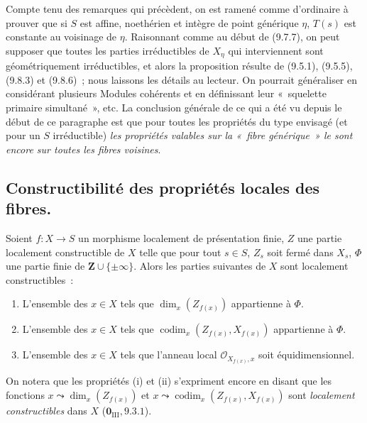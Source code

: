 \begin{remark}[9.8.9]
Compte tenu des remarques qui précèdent, on est ramené comme d'ordinaire à
prouver que si $S$ est affine, noethérien et intègre de point générique $\eta$,
$T(s)$ est constante au voisinage de $\eta$. Raisonnant comme au début de
(9.7.7), on peut supposer que toutes les parties irréductibles de $X_\eta$ qui
interviennent sont géométriquement irréductibles, et alors la proposition
résulte de (9.5.1), (9.5.5), (9.8.3) et (9.8.6)~; nous laissons les détails au
lecteur. On pourrait généraliser en considérant plusieurs Modules cohérents et
en définissant leur «~squelette primaire simultané~», etc. La conclusion
générale de ce qui a été vu depuis le début de ce paragraphe est que pour toutes
les propriétés du type envisagé (et pour un $S$ irréductible) \emph{les
propriétés valables sur la «~fibre générique~» le sont encore sur toutes les
fibres voisines}.
\end{remark}

\subsection{Constructibilité des propriétés locales des fibres.}
\label{subsection:IV.9.9-fr}

\begin{proposition}[9.9.1]
\label{IV.9.9.1-fr}
Soient $f:X\to S$ un morphisme localement de présentation finie, $Z$ une
partie localement constructible de $X$ telle que pour tout $s\in S$, $Z_s$ soit
fermé dans $X_s$, $\Phi$ une partie finie de $\mathbf Z\cup\{\pm\infty\}$.
Alors les parties suivantes de $X$ sont localement constructibles~:
\begin{enumerate}
\item[\textup{(i)}] L'ensemble des $x\in X$ tels que
$\dim_x(Z_{f(x)})$ appartienne à $\Phi$.
\item[\textup{(ii)}] L'ensemble des $x\in X$ tels que
$\operatorname{codim}_x(Z_{f(x)},X_{f(x)})$ appartienne à $\Phi$.
\item[\textup{(iii)}] L'ensemble des $x\in X$ tels que l'anneau local
$\mathcal O_{X_{f(x)},x}$ soit équidimensionnel.
\end{enumerate}
\end{proposition}

On notera que les propriétés (i) et (ii) s'expriment encore en disant que les
fonctions $x\leadsto\dim_x(Z_{f(x)})$ et
$x\leadsto\operatorname{codim}_x(Z_{f(x)},X_{f(x)})$ sont
\emph{localement constructibles} dans $X$ ($\mathbf 0_{\mathrm{III}},9.3.1$).

